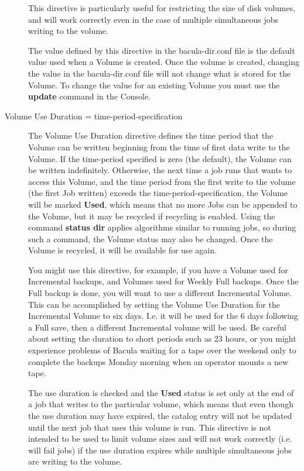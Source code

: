 \begin{description}
   This directive is particularly useful for restricting the size
   of disk volumes, and will work correctly even in the case of
   multiple simultaneous jobs writing to the volume.

   The value defined by this directive in the bacula-dir.conf file is the
   default value used when a Volume is created.  Once the volume is
   created, changing the value in the bacula-dir.conf file will not change
   what is stored for the Volume.  To change the value for an existing
   Volume you must use the {\bf update} command in the Console.

\item [Volume Use Duration = \lt{}time-period-specification\gt{}]
   The Volume Use Duration directive defines the time period that the
   Volume can be written beginning from the time of first data write to the
   Volume.  If the time-period specified is zero (the default), the Volume
   can be written indefinitely.  Otherwise, the next time a job
   runs that wants to access this Volume, and the time period from the
   first write to the volume (the first Job written) exceeds the
   time-period-specification, the Volume will be marked {\bf Used}, which
   means that no more Jobs can be appended to the Volume, but it may be
   recycled if recycling is enabled. Using the command {\bf
   status dir} applies algorithms similar to running jobs, so
   during such a command, the Volume status may also be changed.
   Once the Volume is
   recycled, it will be available for use again.
   
   You might use this directive, for example, if you have a Volume used for
   Incremental backups, and Volumes used for Weekly Full backups.  Once the
   Full backup is done, you will want to use a different Incremental
   Volume.  This can be accomplished by setting the Volume Use Duration for
   the Incremental Volume to six days.  I.e.  it will be used for the 6
   days following a Full save, then a different Incremental volume will be
   used.  Be careful about setting the duration to short periods such as 23
   hours, or you might experience problems of Bacula waiting for a tape
   over the weekend only to complete the backups Monday morning when an
   operator mounts a new tape.
   
   The use duration is checked and the {\bf Used} status is set only at the
   end of a job that writes to the particular volume, which means that even
   though the use duration may have expired, the catalog entry will not be
   updated until the next job that uses this volume is run. This
   directive is not intended to be used to limit volume sizes
   and will not work correctly (i.e. will fail jobs) if the use
   duration expires while multiple simultaneous jobs are writing
   to the volume.
      

\end{description}
